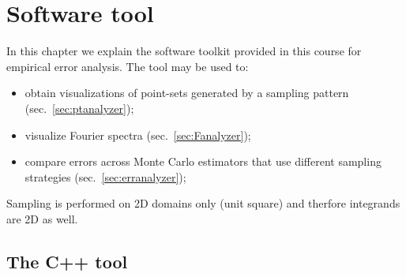 
 \chapter{Software tool}
In this chapter we explain the software toolkit provided in this course for empirical error analysis. The tool may be used to:
\begin{itemize}
 \item obtain visualizations of point-sets generated by a sampling pattern (sec.~\ref{sec:ptanalyzer});
 \item visualize Fourier spectra (sec.~\ref{sec:Fanalyzer}); 
 \item compare errors across Monte Carlo estimators that use different sampling strategies (sec.~\ref{sec:erranalyzer}); 
\end{itemize}
Sampling is performed on 2D domains only (unit square) and therfore integrands are 2D as well. 

\section{The C++ tool}
